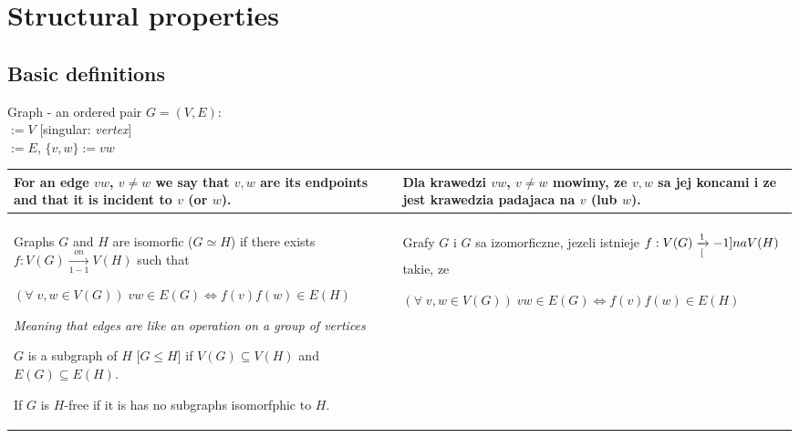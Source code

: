 \section{Structural properties}

\subsection{Basic definitions}

\pdef

    {\color{def}Graph} - an ordered pair $G=(V,E)$:\smallskip\\
     $:=V$ [singular: \emph{vertex}]\\
     $:=E$, $\{v,w\}:=vw$

\kdef 

\begin{tabularx}{\textwidth}{ X!{\color{git90gray}\vrule} X }

    For an edge $vw$, $v\neq w$ we say that $v,w$ are its {\color{acc}endpoints} and that it is {\color{acc}incident} to $v$ (or $w$). 
    \medskip

    &
    Dla krawedzi $vw$, $v\neq w$ mowimy, ze $v,w$ sa jej {\color{acc}koncami} i ze jest krawedzia {\color{acc}padajaca} na $v$ (lub $w$).
    \medskip

    \\

    \hline

    & \\

    Graphs $G$ and $H$ are {\color{def}isomorfic} ($G\simeq H$) if there exists $f:V(G)\xrightarrow[1-1]{on} V(H)$ such that
    
    $(\forall\;v,w\in V(G))\;vw\in E(G)\iff f(v)f(w)\in E(H)$
    \smallskip

    \emph{\color{dyg}Meaning that edges are like an operation on a group of vertices}
    \medskip

    $G$ is a {\color{def}subgraph} of $H$ [$G\leq H$] if $V(G)\subseteq V(H)$ and $E(G)\subseteq E(H)$.
    \medskip

    If $G$ is {\color{def}$H$-free} if it is has no subgraphs isomorfphic to $H$.
    \medskip

    &
    Grafy $G$ i $G$ sa {\color{def}izomorficzne}, jezeli istnieje $f:V(G)\xrightarrow[[]{1}-1]{na}V(H)$ takie, ze

    $(\forall\;v,w\in V(G))\;vw\in E(G)\iff f(v)f(w)\in E(H)$
    \medskip


\end{tabularx}

